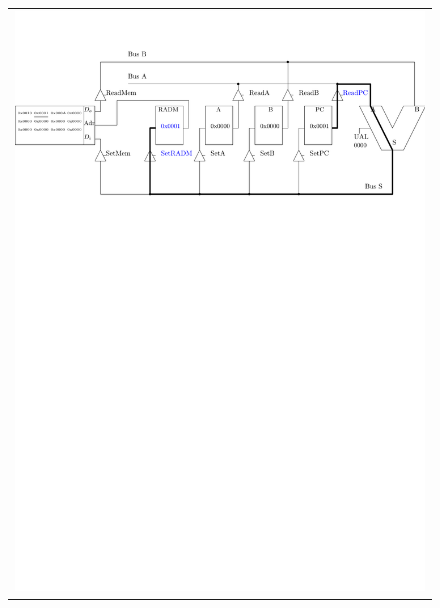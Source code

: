 \begin{figure}[htbp]
\begin{tabular}{c}
\includegraphics[width=\linewidth]{Figs/premier_chemin_ldb_1.pdf}\\

\end{tabular}
\end{figure}
